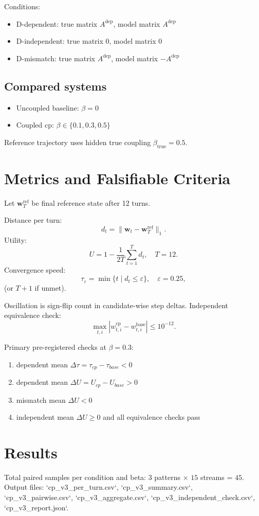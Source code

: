 \documentclass[11pt,a4paper]{article}
\begin{document}
Conditions:
\begin{itemize}
  \item D-dependent: true matrix \(A^{\mathrm{dep}}\), model matrix \(A^{\mathrm{dep}}\)
  \item D-independent: true matrix \(0\), model matrix \(0\)
  \item D-mismatch: true matrix \(A^{\mathrm{dep}}\), model matrix \(-A^{\mathrm{dep}}\)
\end{itemize}

\subsection{Compared systems}
\begin{itemize}
  \item Uncoupled baseline: \(\beta=0\)
  \item Coupled cp: \(\beta\in\{0.1,0.3,0.5\}\)
\end{itemize}
Reference trajectory uses hidden true coupling \(\beta_{\text{true}}=0.5\).

\section{Metrics and Falsifiable Criteria}
Let \(\mathbf{w}^{\mathrm{ref}}_T\) be final reference state after 12 turns.

Distance per turn:
\[
d_t = \lVert \mathbf{w}_t-\mathbf{w}^{\mathrm{ref}}_T \rVert_1.
\]
Utility:
\[
U = 1 - \frac{1}{2T}\sum_{t=1}^{T} d_t,\quad T=12.
\]
Convergence speed:
\[
\tau_{\varepsilon}=\min\{t\mid d_t\le\varepsilon\},\quad \varepsilon=0.25,
\]
(or \(T+1\) if unmet).

Oscillation is sign-flip count in candidate-wise step deltas.
Independent equivalence check:
\[
\max_{t,i}|w^{\mathrm{cp}}_{t,i}-w^{\mathrm{base}}_{t,i}|\le 10^{-12}.
\]

Primary pre-registered checks at \(\beta=0.3\):
\begin{enumerate}
  \item dependent mean \(\Delta\tau=\tau_{cp}-\tau_{base}<0\)
  \item dependent mean \(\Delta U=U_{cp}-U_{base}>0\)
  \item mismatch mean \(\Delta U<0\)
  \item independent mean \(\Delta U\ge 0\) and all equivalence checks pass
\end{enumerate}

\section{Results}
Total paired samples per condition and beta: \(3\) patterns \(\times\) \(15\) streams = \(45\).
Output files: `cp\_v3\_per\_turn.csv`, `cp\_v3\_summary.csv`, `cp\_v3\_pairwise.csv`, `cp\_v3\_aggregate.csv`, `cp\_v3\_independent\_check.csv`, `cp\_v3\_report.json`.
\end{document}
